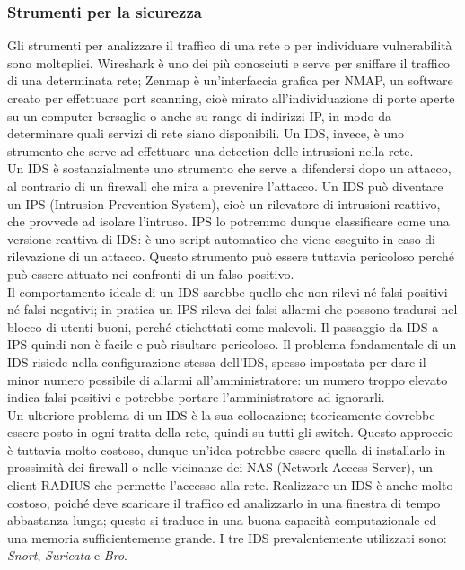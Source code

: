 \subsubsection{Strumenti per la sicurezza}
Gli strumenti per analizzare il traffico di una rete o per individuare vulnerabilità sono molteplici. Wireshark è uno dei più conosciuti e serve per sniffare il traffico di una determinata rete; Zenmap è un'interfaccia grafica per NMAP, un software creato per effettuare port scanning, cioè mirato all'individuazione di porte aperte su un computer bersaglio o anche su range di indirizzi IP, in modo da determinare quali servizi di rete siano disponibili. Un IDS, invece, è uno strumento che serve ad effettuare una detection delle intrusioni nella rete.\\
Un IDS è sostanzialmente uno strumento che serve a difendersi dopo un attacco, al contrario di un firewall che mira a prevenire l'attacco. Un IDS può diventare un IPS (Intrusion Prevention System), cioè un rilevatore di intrusioni reattivo, che provvede ad isolare l'intruso. IPS lo potremmo dunque classificare come una versione reattiva di IDS: è uno script automatico che viene eseguito in caso di rilevazione di un attacco. Questo strumento può essere tuttavia pericoloso perché può essere attuato nei confronti di un falso positivo.\\
Il comportamento ideale di un IDS sarebbe quello che non rilevi né falsi positivi né falsi negativi; in pratica un IPS rileva dei falsi allarmi che possono tradursi nel blocco di utenti buoni, perché etichettati come malevoli. Il passaggio da IDS a IPS quindi non è facile e può risultare pericoloso. Il problema fondamentale di un IDS risiede nella configurazione stessa dell'IDS, spesso impostata per dare il minor numero possibile di allarmi all'amministratore: un numero troppo elevato indica falsi positivi e potrebbe portare l'amministratore ad ignorarli.\\
Un ulteriore problema di un IDS è la sua collocazione; teoricamente dovrebbe essere posto in ogni tratta della rete, quindi su tutti gli switch. Questo approccio è tuttavia molto costoso, dunque un'idea potrebbe essere quella di installarlo in prossimità dei firewall o nelle vicinanze dei NAS (Network Access Server), un client RADIUS che permette l'accesso alla rete. Realizzare un IDS è anche molto costoso, poiché deve scaricare il traffico ed analizzarlo in una finestra di tempo abbastanza lunga; questo si traduce in una buona capacità computazionale ed una memoria sufficientemente grande. I tre IDS prevalentemente utilizzati sono: \textit{Snort}, \textit{Suricata} e \textit{Bro}.\\
